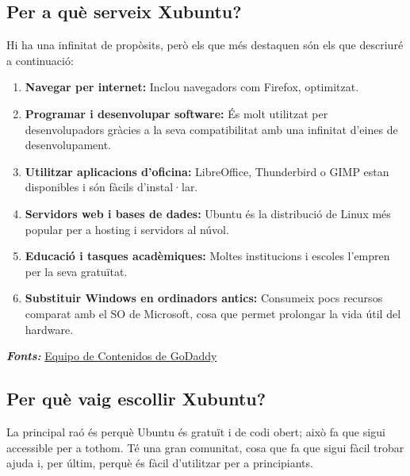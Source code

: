 \subsection{Per a què serveix Xubuntu?}
Hi ha una infinitat de propòsits, però els que més destaquen són els que descriuré a continuació:
\begin{enumerate}
 \item \textbf{Navegar per internet:} Inclou navegadors com Firefox, optimitzat.
 \item \textbf{Programar i desenvolupar software:} És molt utilitzat per desenvolupadors gràcies a la seva compatibilitat amb una infinitat d’eines de desenvolupament.
 \item \textbf{Utilitzar aplicacions d’oficina:} LibreOffice, Thunderbird o GIMP estan disponibles i són fàcils d’instal·lar.
 \item \textbf{Servidors web i bases de dades:} Ubuntu és la distribució de Linux més popular per a hosting i servidors al núvol.
 \item \textbf{Educació i tasques acadèmiques:} Moltes institucions i escoles l’empren per la seva gratuïtat.
 \item \textbf{Substituir Windows en ordinadors antics:} Consumeix pocs recursos comparat amb el SO de Microsoft, cosa que permet prolongar la vida útil del hardware.
\end{enumerate}

\textit{\textbf{Fonts:}} \href{https://www.godaddy.com/resources/es/crearweb/que-es-ubuntu-y-para-que-sirve}{Equipo de Contenidos de GoDaddy}

\subsection{Per què vaig escollir Xubuntu?}
La principal raó és perquè Ubuntu és gratuït i de codi obert; això fa que sigui accessible per a tothom. Té una gran comunitat, cosa que fa que sigui fàcil trobar ajuda i, per últim, perquè és fàcil d’utilitzar per a principiants.





